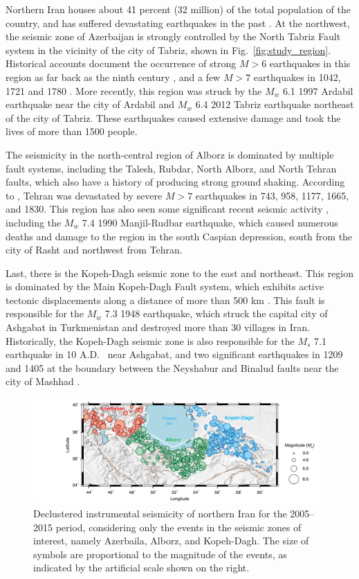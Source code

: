 Northern Iran houses about 41 percent (32 million) of the total population of the country, and has suffered devastating earthquakes in the past \citep[e.g.,][]{Mehrain_1990_Tech, Chafory-Ashtiany_1999_DPM, Razzaghi_2012_Tech}. At the northwest, the seismic zone of Azerbaijan is strongly controlled by the North Tabriz Fault system in the vicinity of the city of Tabriz, shown in Fig.~\ref{fig:study_region}. Historical accounts document the occurrence of strong $M>6$ earthquakes in this region as far back as the ninth century \citep{Berberian1999}, and a few $M>7$ earthquakes in 1042, 1721 and 1780 \citep{Jones1834}. More recently, this region was struck by the $M_w$ 6.1 1997 Ardabil earthquake near the city of Ardabil and $M_w$ 6.4 2012 Tabriz earthquake northeast of the city of Tabriz. These earthquakes caused extensive damage and took the lives of more than 1500 people. 

The seismicity in the north-central region of Alborz is dominated by multiple fault systems, including the Talesh, Rubdar, North Alborz, and North Tehran faults, which also have a history of producing strong ground shaking. According to \citet{Ambraseys_1982_Book}, Tehran was devastated by severe $M>7$ earthquakes in 743, 958, 1177, 1665, and 1830. This region has also seen some significant recent seismic activity \citep{Berberian1999}, including the $M_w$ 7.4 1990 Manjil-Rudbar earthquake, which caused numerous deaths and damage to the region in the south Caspian depression, south from the city of Rasht and northwest from Tehran. 

Last, there is the Kopeh-Dagh seismic zone to the east and northeast. This region is dominated by the Main Kopeh-Dagh Fault system, which exhibits active tectonic displacements along a distance of more than 500 km \citep{Trifonov1978}. This fault is responsible for the $M_w$ 7.3 1948 earthquake, which struck the capital city of Ashgabat in Turkmenistan and destroyed more than 30 villages in Iran. Historically, the Kopeh-Dagh seismic zone is also responsible for the $M_s$ 7.1 earthquake in 10 A.D.~\citep{Berberian2001} near Ashgabat, and two significant earthquakes in 1209 and 1405 at the boundary between the Neyshabur and Binalud faults near the city of Mashhad \citep{Berberian1999}.

\begin{figure}[t]
	\centering
	\includegraphics[width=\textwidth]{figures/pdf/figure-03} 
	\caption{Declustered instrumental seismicity of northern Iran for the 2005--2015 period, considering only the events in the seismic zones of interest, namely Azerbaila, Alborz, and Kopeh-Dagh. The size of symbols are proportional to the magnitude of the events, as indicated by the artificial scale shown on the right.}
	\label{fig:seismicity}
\end{figure}

